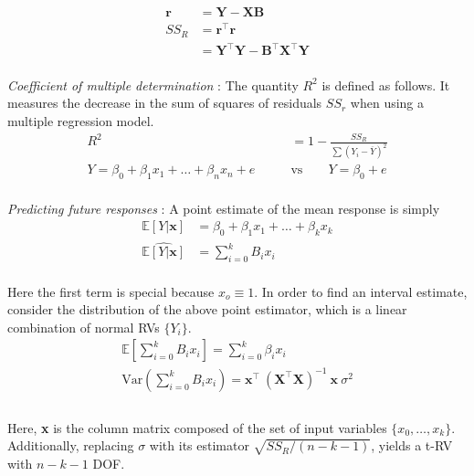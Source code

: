 \begin{align}
	\textbf{r} &= \textbf{Y} - \textbf{X} \textbf{B} \\
	SS_R &= \textbf{r}^\intercal \textbf{r} \\
	&= \textbf{Y}^\intercal \textbf{Y} - \textbf{B}^\intercal \textbf{X}^\intercal \textbf{Y}
\end{align}\\

\textit{Coefficient of multiple determination} : The quantity $ R^2$ is defined as follows. It measures the decrease in the sum of squares of residuals $ SS_r $ when using a multiple regression model.\\

\begin{align}
	R^2 &= 1 - \frac{SS_R}{\sum (Y_i - \overline{Y})^2}\\
	Y = \beta_0 + \beta_1 x_1 + \dots + \beta_n x_n + e \qquad &\text{vs} \qquad Y = \beta_0 + e
\end{align}\\

\textit{Predicting future responses} : A point estimate of the mean response is simply \\

\begin{align}
	\mathbb{E}[Y|\textbf{x}] &= \beta_0 + \beta_1 x_1 + \dots + \beta_k x_k \nonumber \\
	\widehat{\mathbb{E}[Y|\textbf{x}]} &= \sum\limits_{i = 0}^{k} B_i x_i
\end{align}\\

Here the first term is special because $ x_o \equiv 1 $. In order to find an interval estimate, consider the distribution of the above point estimator, which is a linear combination of normal RVs $ \{Y_i\} $.\\

\begin{align}
	\mathbb{E}\left[\sum\limits_{i = 0}^{k} B_i x_i\right] = \sum\limits_{i = 0}^{k} \beta_i x_i \\
	\mathrm{Var}\left(\sum\limits_{i = 0}^{k} B_i x_i\right) = \textbf{x}^\intercal \ (\textbf{X}^\intercal \textbf{X})^{-1}\ \textbf{x}\ \sigma^2 \\
\end{align}\\

Here, \textbf{x} is the column matrix composed of the set of input variables $ \{x_0, \dots, x_k\} $. Additionally, replacing $ \sigma $ with its estimator $ \sqrt{SS_R / (n-k-1)} $, yields a t-RV with $ n-k-1 $ DOF.\\

